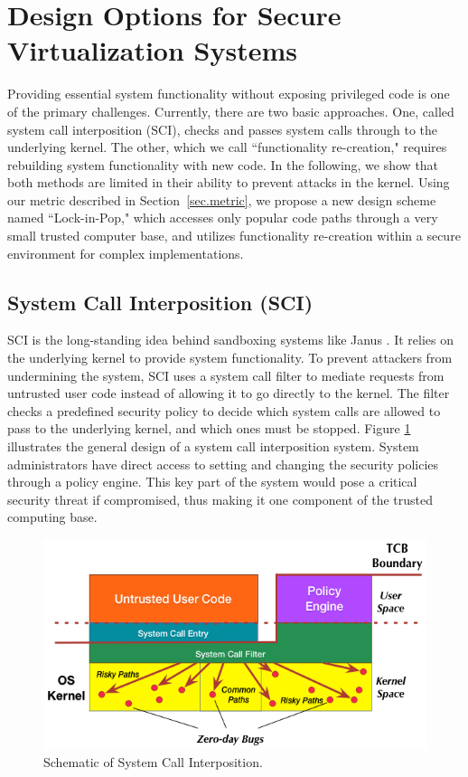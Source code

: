 \section{Design Options for Secure Virtualization Systems}
\label{sec.design}

Providing essential system functionality without exposing privileged code is one of the
primary challenges.
Currently, there are two basic approaches.
One, called system call interposition (SCI), checks and passes system calls
through to the underlying kernel. The other, which we call ``functionality
re-creation," requires rebuilding system functionality with new code. In the
following, we show that both methods are limited in their ability to
prevent attacks in the kernel.
Using our metric described in Section~\ref{sec.metric},
we propose a new design scheme named ``Lock-in-Pop," which accesses only popular
 code paths through a very small trusted computer base, and utilizes
 functionality re-creation within a secure environment for complex implementations.

\subsection{System Call Interposition (SCI)}
SCI is the long-standing idea behind sandboxing systems like Janus
\cite{Janus0:96, Janus:99}. It relies on the underlying kernel
to provide system functionality. To prevent attackers from undermining the system,
SCI uses a system call filter to mediate requests
from untrusted user code instead of allowing it to go directly to the kernel.
The filter checks a predefined security policy to decide which system calls are
allowed to pass to the underlying kernel, and which ones must be stopped.
Figure \ref{fig:design_system_call_interposition} illustrates the general design
of a system call interposition system. System administrators have direct access to
setting and changing the security policies through a policy engine.
This key part of the system would pose a critical security threat if compromised, thus making it
one component of the trusted computing base.

\begin{figure}%
\centering
\includegraphics[width=1.0\columnwidth]{diagram/Virtualization_Design_Model_03.png}
\caption{\small Schematic of System Call Interposition.}
\label{fig:design_system_call_interposition}
\end{figure}

